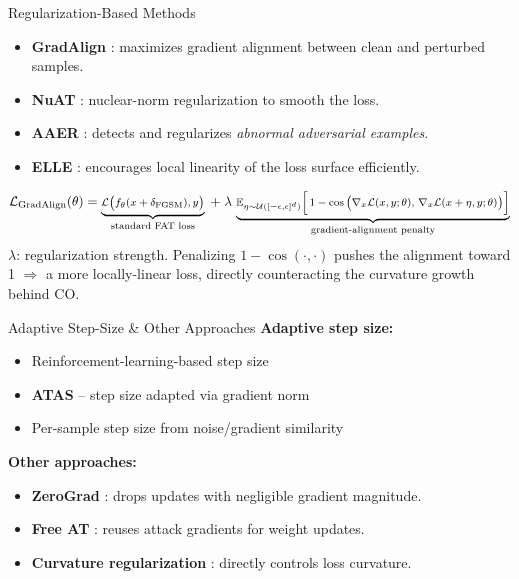 \documentclass[11pt,aspectratio=169]{beamer}
\begin{document}
\begin{frame}{Regularization-Based Methods}
  \begin{itemize}
    \item \textbf{GradAlign} \cite{andriushchenko2020understanding}: maximizes gradient alignment between clean and perturbed samples.
    \item \textbf{NuAT} \cite{sriramanan2021towards}: nuclear-norm regularization to smooth the loss.
    \item \textbf{AAER} \cite{lin2023eliminating}: detects and regularizes \emph{abnormal adversarial examples}.
    \item \textbf{ELLE} \cite{rocamora2024efficient}: encourages local linearity of the loss surface efficiently.
  \end{itemize}

  \vskip -0.1cm
  \[
  \footnotesize
  \mathcal{L}_{\text{GradAlign}}(\theta) = \underbrace{\mathcal{L}\big(f_\theta(x+\delta_{\text{FGSM}}), y\big)}_{\text{standard FAT loss}} \; + \; \lambda \, \underbrace{\mathbb{E}_{\eta\sim\mathcal{U}([-\epsilon,\epsilon]^d)}\Big[\, 1 - \cos\big(\nabla_x \mathcal{L}(x,y;\theta),\, \nabla_x \mathcal{L}(x+\eta,y;\theta)\big) \Big]}_{\text{gradient-alignment penalty}}
  \]
  \vskip 0.10cm
  {\scriptsize 
    $\lambda$: regularization strength. Penalizing $1-\cos(\cdot,\cdot)$ pushes the alignment toward 1 $\Rightarrow$ a more locally-linear loss, directly counteracting the curvature growth behind CO.
  }
  \vskip 0.15cm
  
\end{frame}

\begin{frame}{Adaptive Step-Size \& Other Approaches}
  \textbf{Adaptive step size:}
  \begin{itemize}
    \item Reinforcement-learning-based step size \cite{nie2021adaptive}
    \item \textbf{ATAS} -- step size adapted via gradient norm \cite{huang2023fast}
    \item Per-sample step size from noise/gradient similarity \cite{zhao2025avoiding}
  \end{itemize}
  \vskip 0.2cm
  \textbf{Other approaches:}
  \begin{itemize}
    \item \textbf{ZeroGrad} \cite{golgooni2023zerograd}: drops updates with negligible gradient magnitude.
    \item \textbf{Free AT} \cite{shafahi2019adversarial}: reuses attack gradients for weight updates.
    \item \textbf{Curvature regularization} \cite{moosavi2019robustness}: directly controls loss curvature.
  \end{itemize}
\end{frame}
\end{document}
